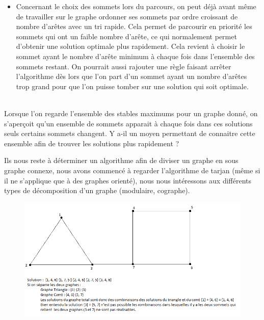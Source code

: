\documentclass[10pt,a4paper]{article}
\begin{document}
\begin{itemize}
\item Concernant le choix des sommets lors du parcours, on peut déjà avant même de travailler sur le graphe ordonner ses sommets par ordre croissant de nombre d'arêtes avec un tri rapide. Cela permet de parcourir en priorité les sommets qui ont un faible nombre d'arête, ce qui normalement permet d'obtenir une solution optimale plus rapidement. Cela revient à choisir le sommet ayant le nombre d'arête minimum à chaque fois dans l'ensemble des sommets restant. On pourrait aussi rajouter une règle faisant arrêter l'algorithme dès lors que l'on part d'un sommet ayant un nombre d'arêtes trop grand pour que l'on puisse tomber sur une solution qui soit optimale.\\\\
\end{itemize}

Lorsque l'on regarde l'ensemble des stables maximums pour un graphe donné, on s'aperçoit qu'un ensemble de sommets apparait à chaque fois dans ces solutions seuls certains sommets changent. Y a-il un moyen permettant de connaitre cette ensemble afin de trouver les solutions plus rapidement ?

Ils nous reste à déterminer un algorithme afin de diviser un graphe en sous graphe connexe, nous avons commencé à regarder l'algorithme de tarjan (même si il ne s'applique que à des graphes orienté), nous nous intéressons aux différents types de décomposition d'un graphe (modulaire, cographe).

\begin{figure}[h]
 \hspace{-4cm}
\includegraphics[scale=1]{image1.png}
\end{figure} 
\end{document}
